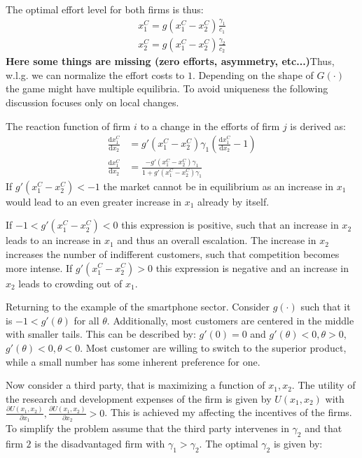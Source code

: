 \documentclass[a4paper, 11pt]{article}
\renewcommand{\d}{\text{d}}
\begin{document}
The optimal effort level for both firms is thus:
\begin{align}
x_1^C = g(x_1^C-x_2^C)\frac{\gamma_1}{c_1}\\
x_2^C = g(x_1^C-x_2^C)\frac{\gamma_2}{c_2}
\end{align}
\textbf{Here some things are missing (zero efforts, asymmetry, etc...)}Thus, w.l.g. we can normalize the effort costs to $1$. Depending on the shape of $G(\cdot)$ the game might have multiple equilibria. To avoid uniqueness the following discussion focuses only on local changes.

The reaction function of firm $i$ to a change in the efforts of firm $j$ is derived as:
\begin{align}
\frac{\d x_1^C}{\d x_2} &= g'(x_1^C-x_2^C)\gamma_1\left(\frac{\d x_1^C}{\d x_2}-1\right)\\
\frac{\d x_1^C}{\d x_2} &= \frac{-g'(x_1^C-x_2^C)\gamma_1}{1+g'(x_1^C-x_2^C)\gamma_1}
\end{align}
If $g'(x_1^C-x_2^C)<-1$ the market cannot be in equilibrium as an increase in $x_1$ would lead to an even greater increase in $x_1$ already by itself.

If $-1<g'(x_1^C-x_2^C)<0$ this expression is positive, such that an increase in $x_2$ leads to an increase in $x_1$ and thus an overall escalation. The increase in $x_2$ increases the number of indifferent customers, such that competition becomes more intense. If $g'(x_1^C-x_2^C)>0$ this expression is negative and an increase in $x_2$ leads to crowding out of $x_1$. 

Returning to the example of the smartphone sector. Consider $g(\cdot)$ such that it is $-1<g'(\theta)$ for all $\theta$. Additionally, most customers are centered in the middle with smaller tails. This can be described by: $g'(0)=0$ and $g'(\theta)<0, \theta>0$,$g'(\theta)<0, \theta<0$. Most customer are willing to switch to the superior product, while a small number has some inherent preference for one.

Now consider a third party, that is maximizing a function of $x_1, x_2$. The utility of the research and development expenses of the firm is given by $U(x_1,x_2)$ with $\frac{\partial U(x_1,x_2)}{\partial x_1},\frac{\partial U(x_1,x_2)}{\partial x_2}>0$. This is achieved my affecting the incentives of the firms. To simplify the problem assume that the third party intervenes in $\gamma_2$ and that firm $2$ is the disadvantaged firm with $\gamma_1>\gamma_2$. The optimal $\gamma_2$ is given by:
\end{document}
